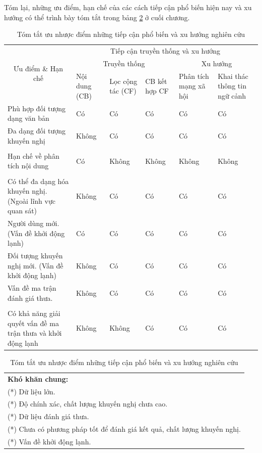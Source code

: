 Tóm lại, những ưu điểm, hạn chế của các cách tiếp cận phổ biến hiện nay và xu hướng có thể trình bày tóm tắt trong bảng \ref{tab:table_1_2} ở cuối chương.
\begin{table}[ht]
\centering
    \caption{Tóm tắt ưu nhược điểm những tiếp cận phổ biến và xu hướng nghiên cứu}\label{tab:table_1_2}
    \begin{tabular}{|p{5.5cm}|p{1.5cm}|p{1.5cm}|p{1.5cm}|p{1.5cm}|p{1.5cm}|}
    \hline
    \multicolumn{1}{|c|}{\multirow{3}{*}{Ưu điểm \& Hạn chế}} & \multicolumn{5}{|c|}{Tiếp cận truyền thống và xu hướng} \\ 
    \cline{2-6}
    & \multicolumn{3}{|c|}{Truyền thống} & \multicolumn{2}{c|}{Xu hướng} \\
    \cline{2-6}
    & Nội dung (CB) & Lọc cộng tác (CF) & CB kết hợp CF & Phân tích mạng xã hội & Khai thác thông tin ngữ cảnh\\
    \hline
	Phù hợp đối tượng dạng văn bản & Có & Có & Có & Có & Có \\ 
	\hline
	Đa dạng đối tượng khuyến nghị & Không & Có & Có & Có & Có \\
	& & & & & \\
	\hline
	Hạn chế về phân tích nội dung & Có & Không & Không & Không & Không \\
	& & & & & \\
	\hline
	Có thể đa dạng hóa khuyến nghị. (Ngoài lĩnh vực quan sát) & Không & Có & Có & Có & Có \\
	\hline
	Người dùng mới. (Vấn đề khởi động lạnh) & Có & Có & Có & Có & Có \\
	\hline
	Đối tượng khuyến nghị mới. (Vấn đề khởi động lạnh) & Không & Có & Có & Có & Có \\
	\hline
	Vấn đề ma trận đánh giá thưa. & Không & Có & Có & Có & Có \\
	& & & & & \\
	\hline
	Có khả năng giải quyết vấn đề ma trận thưa và khởi động lạnh & Không & Không & Có & Có & Có \\
	\hline
	\end{tabular} 
	\begin{tabular}{|p{15.2 cm}|}
	\hline
	\textbf{Khó khăn chung:} \\
	(*) Dữ liệu lớn. \\
	(*) Độ chính xác, chất lượng khuyến nghị chưa cao. \\
	(*) Dữ liệu đánh giá thưa. \\
	(*) Chưa có phương pháp tốt để đánh giá kết quả, chất lượng khuyến nghị. \\
	(*) Vấn đề khởi động lạnh. \\
	\hline
	\end{tabular}
\end{table}

